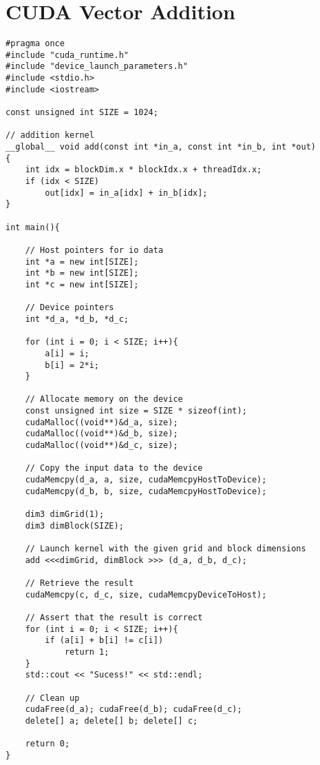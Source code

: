 \chapter{CUDA Vector Addition} \label{appendix:CUDAVecAdd}


\begin{lstlisting}
#pragma once
#include "cuda_runtime.h"
#include "device_launch_parameters.h"
#include <stdio.h>
#include <iostream>

const unsigned int SIZE = 1024;

// addition kernel
__global__ void add(const int *in_a, const int *in_b, int *out)
{
	int idx = blockDim.x * blockIdx.x + threadIdx.x;
	if (idx < SIZE)
		out[idx] = in_a[idx] + in_b[idx];
}

int main(){

	// Host pointers for io data
	int *a = new int[SIZE];
	int *b = new int[SIZE];
	int *c = new int[SIZE];

	// Device pointers
	int *d_a, *d_b, *d_c;

	for (int i = 0; i < SIZE; i++){
		a[i] = i;
		b[i] = 2*i;
	}

	// Allocate memory on the device
	const unsigned int size = SIZE * sizeof(int);
	cudaMalloc((void**)&d_a, size);
	cudaMalloc((void**)&d_b, size);
	cudaMalloc((void**)&d_c, size);
	
	// Copy the input data to the device
	cudaMemcpy(d_a, a, size, cudaMemcpyHostToDevice);
	cudaMemcpy(d_b, b, size, cudaMemcpyHostToDevice);

	dim3 dimGrid(1);
	dim3 dimBlock(SIZE);

	// Launch kernel with the given grid and block dimensions
	add <<<dimGrid, dimBlock >>> (d_a, d_b, d_c);

	// Retrieve the result
	cudaMemcpy(c, d_c, size, cudaMemcpyDeviceToHost);

	// Assert that the result is correct
	for (int i = 0; i < SIZE; i++){
		if (a[i] + b[i] != c[i])
			return 1;
	}
	std::cout << "Sucess!" << std::endl;

	// Clean up
	cudaFree(d_a); cudaFree(d_b); cudaFree(d_c);
	delete[] a; delete[] b; delete[] c;

	return 0;
}
\end{lstlisting}